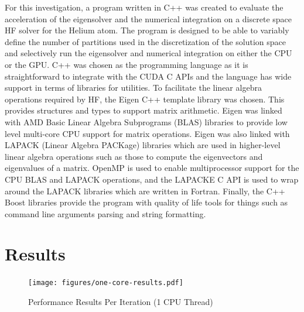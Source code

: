 \documentclass[journal, twoside]{IEEEtran}
\begin{document}
For this investigation, a program written in C++ was created to evaluate the acceleration of the eigensolver and the numerical integration on a discrete space HF solver for the Helium atom. The program is designed to be able to variably define the number of partitions used in the discretization of the solution space and selectively run the eigensolver and numerical integration on either the CPU or the GPU. C++ was chosen as the programming language as it is straightforward to integrate with the CUDA C APIs and the language has wide support in terms of libraries for utilities. To facilitate the linear algebra operations required by HF, the Eigen \cite{eigen} C++ template library was chosen. This provides structures and types to support matrix arithmetic. Eigen was linked with AMD Basic Linear Algebra Subprograms (BLAS) libraries \cite{amd-blas} to provide low level multi-core CPU support for matrix operations. Eigen was also linked with LAPACK (Linear Algebra PACKage) \cite{lapack} libraries which are used in higher-level linear algebra operations such as those to compute the eigenvectors and eigenvalues of a matrix. OpenMP is used to enable multiprocessor support for the CPU BLAS and LAPACK operations, and the LAPACKE C API is used to wrap around the LAPACK libraries which are written in Fortran. Finally, the C++ Boost libraries provide the program with quality of life tools for things such as command line arguments parsing and string formatting.


\section{Results}

\begin{figure}[ht]
\centering
\texttt{[image: figures/one-core-results.pdf]}
\caption{Performance Results Per Iteration (1 CPU Thread)}
\label{perf-results-per-iteration-one-core}
\end{figure}
\end{document}
